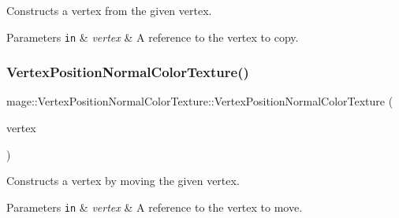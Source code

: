 Constructs a vertex from the given vertex.


\begin{DoxyParams}[1]{Parameters}
\mbox{\tt in}  & {\em vertex} & A reference to the vertex to copy. \\
\hline
\end{DoxyParams}
\hypertarget{structmage_1_1_vertex_position_normal_color_texture_aa23061d16a1c231debc79d44db8f0a6e}{}\label{structmage_1_1_vertex_position_normal_color_texture_aa23061d16a1c231debc79d44db8f0a6e} 
\subsubsection{\texorpdfstring{Vertex\+Position\+Normal\+Color\+Texture()}{VertexPositionNormalColorTexture()}\hspace{0.1cm}{\footnotesize\ttfamily [4/4]}}
{\footnotesize\ttfamily mage\+::\+Vertex\+Position\+Normal\+Color\+Texture\+::\+Vertex\+Position\+Normal\+Color\+Texture (\begin{DoxyParamCaption}\item[{\hyperlink{structmage_1_1_vertex_position_normal_color_texture}{Vertex\+Position\+Normal\+Color\+Texture} \&\&}]{vertex }\end{DoxyParamCaption})\hspace{0.3cm}{\ttfamily [default]}}

Constructs a vertex by moving the given vertex.


\begin{DoxyParams}[1]{Parameters}
\mbox{\tt in}  & {\em vertex} & A reference to the vertex to move. \\
\hline
\end{DoxyParams}
\hypertarget{structmage_1_1_vertex_position_normal_color_texture_af3538a12eab74715dd9b5256f8765162}{}\label{structmage_1_1_vertex_position_normal_color_texture_af3538a12eab74715dd9b5256f8765162} 
